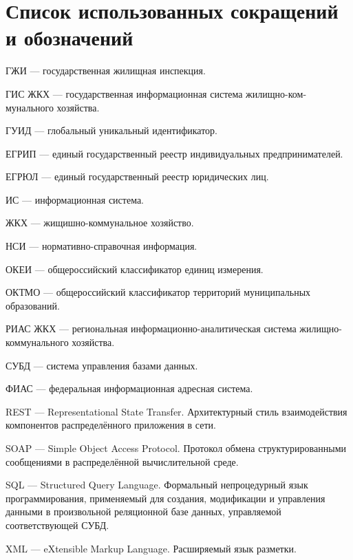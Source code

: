 \section*{Список использованных сокращений и обозначений}

ГЖИ --- государственная жилищная инспекция.

ГИС ЖКХ --- государственная информационная система жилищно-ком-\linebreak мунального хозяйства.

ГУИД --- глобальный уникальный идентификатор.

ЕГРИП --- единый государственный реестр индивидуальных предпринимателей.

ЕГРЮЛ --- единый государственный реестр юридических лиц.

ИС --- информационная система.

ЖКХ --- жищишно-коммунальное хозяйство.

НСИ --- нормативно-справочная информация.

ОКЕИ --- общероссийский классификатор единиц измерения.

ОКТМО --- общероссийский классификатор территорий муниципальных образований.

РИАС ЖКХ --- региональная информационно-аналитическая система жилищно-коммунального хозяйства.

СУБД --- система управления базами данных.

ФИАС --- федеральная информационная адресная система.

REST --- Representational State Transfer. Архитектурный стиль взаимодействия компонентов распределённого приложения в сети.

SOAP --- Simple Object Access Protocol. Протокол обмена структурированными сообщениями в распределённой вычислительной среде.

SQL --- Structured Query Language. Формальный непроцедурный язык программирования, применяемый для создания, модификации и управления данными в произвольной реляционной базе данных, управляемой соответствующей СУБД.

XML --- eXtensible Markup Language. Расширяемый язык разметки.

\clearpage
\newpage